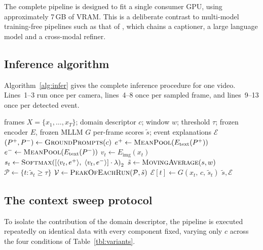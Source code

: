 \documentclass[a4paper,fleqn]{cas-sc}
\begin{document}
The complete pipeline is designed to fit a single consumer GPU, using
approximately 7\,GB of VRAM. This is a deliberate contrast to multi-model
training-free pipelines such as that of \citet{zanella2024lavad}, which chains a
captioner, a large language model and a cross-modal refiner.

\subsection{Inference algorithm}
Algorithm~\ref{alg:infer} gives the complete inference procedure for one video.
Lines~1--3 run once per camera, lines~4--8 once per sampled frame, and lines~9--13
once per detected event.

\begin{algorithm}[h]
\caption{DA-ZVAD inference for one sequence}
\label{alg:infer}
\begin{algorithmic}[1]
\Require frames $X = \{x_1,\dots,x_T\}$; domain descriptor $c$; window $w$;
         threshold $\tau$; frozen encoder $E$, frozen MLLM $G$
\Ensure per-frame scores $\tilde{s}$; event explanations $\mathcal{E}$
\State $(P^{+}, P^{-}) \gets \textproc{GroundPrompts}(c)$
\State $e^{+} \gets \textproc{MeanPool}(E_{\text{text}}(P^{+}))$
\State $e^{-} \gets \textproc{MeanPool}(E_{\text{text}}(P^{-}))$
    \State $v_t \gets E_{\text{img}}(x_t)$ 
    \State $s_t \gets \textproc{Softmax}\!\left(\left[\langle v_t, e^{+}\rangle,\;
           \langle v_t, e^{-}\rangle\right]\cdot\lambda\right)_{2}$
\EndFor
\State $\tilde{s} \gets \textproc{MovingAverage}(s, w)$ 
\State $\mathcal{P} \gets \{t : \tilde{s}_t \ge \tau\}$
\State $\mathcal{V} \gets \textproc{PeakOfEachRun}(\mathcal{P}, \tilde{s})$
    \State $\mathcal{E}[t] \gets G(x_t,\, c,\, \tilde{s}_t)$ 
\EndFor
\State \Return $\tilde{s}, \mathcal{E}$
\end{algorithmic}
\end{algorithm}

\subsection{The context sweep protocol}
\label{sec:sweep}
To isolate the contribution of the domain descriptor, the pipeline is executed
repeatedly on identical data with every component fixed, varying only $c$ across
the four conditions of Table~\ref{tbl:variants}.
\end{document}
